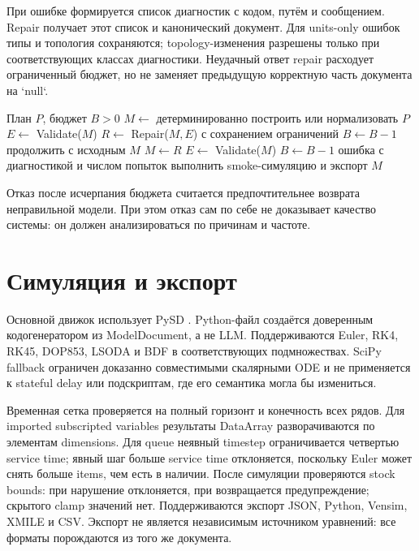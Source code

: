 При ошибке формируется список диагностик с кодом, путём и сообщением. Repair получает этот список и канонический документ. Для units-only ошибок типы и топология сохраняются; topology-изменения разрешены только при соответствующих классах диагностики. Неудачный ответ repair расходует ограниченный бюджет, но не заменяет предыдущую корректную часть документа на `null`.

\begin{algorithm}[H]
    \caption{Ограниченная проверка и исправление}
    \label{alg:bounded-repair}
    \begin{algorithmic}[1]
        \Require План $P$, бюджет $B>0$
        \State $M\gets$ детерминированно построить или нормализовать $P$
        \State $E\gets$ Validate($M$)
            \State $R\gets$ Repair($M,E$) с сохранением ограничений
                \State $B\gets B-1$
                \State продолжить с исходным $M$
            \Else
                \State $M\gets R$
                \State $E\gets$ Validate($M$)
                \State $B\gets B-1$
            \EndIf
        \EndWhile
            \State \Return ошибка с диагностикой и числом попыток
        \Else
            \State выполнить smoke-симуляцию и экспорт
            \State \Return $M$
        \EndIf
    \end{algorithmic}
\end{algorithm}

Отказ после исчерпания бюджета считается предпочтительнее возврата неправильной модели. При этом отказ сам по себе не доказывает качество системы: он должен анализироваться по причинам и частоте.

\section{Симуляция и экспорт}

Основной движок использует PySD \cite{pysd2021}. Python-файл создаётся доверенным кодогенератором из ModelDocument, а не LLM. Поддерживаются Euler, RK4, RK45, DOP853, LSODA и BDF в соответствующих подмножествах. SciPy fallback ограничен доказанно совместимыми скалярными ODE и не применяется к stateful delay или подскриптам, где его семантика могла бы измениться.

Временная сетка проверяется на полный горизонт и конечность всех рядов. Для imported subscripted variables результаты DataArray разворачиваются по элементам dimensions. Для queue неявный timestep ограничивается четвертью service time; явный шаг больше service time отклоняется, поскольку Euler может снять больше items, чем есть в наличии. После симуляции проверяются stock bounds: при  нарушение отклоняется, при  возвращается предупреждение; скрытого clamp значений нет. Поддерживаются экспорт JSON, Python, Vensim, XMILE и CSV. Экспорт не является независимым источником уравнений: все форматы порождаются из того же документа.

